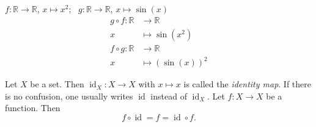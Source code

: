 \begin{example}{} \label{Bsp:Komposition}
\item $f: \mathbb{R} \rightarrow \mathbb{R}$, $x\mapsto x^2$;~ $g:\mathbb{R} \rightarrow \mathbb{R}$, $x\mapsto \sin(x)$
\begin{align*}
g\circ f: \mathbb{R} &\rightarrow \mathbb{R} \\
x &\mapsto \sin(x^2) \\
f\circ g: \mathbb{R} &\rightarrow \mathbb{R} \\
x &\mapsto (\sin(x))^2
\end{align*}
\item Let $X$ be a set. Then $\operatorname{id}_X: X\rightarrow X$ with $x\mapsto x$ is called the \emph{identity map}.
If there is no confusion, one usually writes $\operatorname{id}$ instead of $\operatorname{id}_X$. 
Let $f: X\rightarrow X$ be a function. Then
\[
    f\circ \operatorname{id}=f=\operatorname{id}\circ f.
\]
\end{example}

